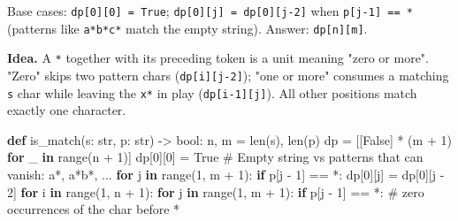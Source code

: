 \documentclass[11pt]{article}
\newenvironment{Shaded}{\begin{snugshade}}{\end{snugshade}}
\newcommand{\BuiltInTok}[1]{\textcolor[rgb]{0.50,0.55,0.55}{#1}}
\newcommand{\CommentTok}[1]{\textcolor[rgb]{0.48,0.49,0.49}{#1}}
\newcommand{\ControlFlowTok}[1]{\textcolor[rgb]{0.99,0.74,0.29}{\textbf{#1}}}
\newcommand{\DecValTok}[1]{\textcolor[rgb]{0.96,0.45,0.00}{#1}}
\newcommand{\KeywordTok}[1]{\textcolor[rgb]{0.81,0.81,0.76}{\textbf{#1}}}
\newcommand{\NormalTok}[1]{\textcolor[rgb]{0.81,0.81,0.76}{#1}}
\newcommand{\OperatorTok}[1]{\textcolor[rgb]{0.81,0.81,0.76}{#1}}
\newcommand{\StringTok}[1]{\textcolor[rgb]{0.96,0.31,0.31}{#1}}
\newcommand{\VariableTok}[1]{\textcolor[rgb]{0.15,0.68,0.68}{#1}}
\begin{document}
Base cases: \texttt{dp{[}0{]}{[}0{]}\ =\ True}; \texttt{dp{[}0{]}{[}j{]}\ =\ dp{[}0{]}{[}j-2{]}} when \texttt{p{[}j-1{]}\ ==\ \textquotesingle{}*\textquotesingle{}} (patterns like \texttt{a*b*c*} match the empty string). Answer: \texttt{dp{[}n{]}{[}m{]}}.

\textbf{Idea.} A \texttt{*} together with its preceding token is a unit meaning "zero or more". "Zero" skips two pattern chars (\texttt{dp{[}i{]}{[}j-2{]}}); "one or more" consumes a matching \texttt{s} char while leaving the \texttt{x*} in play (\texttt{dp{[}i-1{]}{[}j{]}}). All other positions match exactly one character.


\begin{Shaded}
\begin{Highlighting}[]
\KeywordTok{def}\NormalTok{ is\_match(s: }\BuiltInTok{str}\NormalTok{, p: }\BuiltInTok{str}\NormalTok{) }\OperatorTok{{-}\textgreater{}} \BuiltInTok{bool}\NormalTok{:}
\NormalTok{    n, m }\OperatorTok{=} \BuiltInTok{len}\NormalTok{(s), }\BuiltInTok{len}\NormalTok{(p)}
\NormalTok{    dp }\OperatorTok{=}\NormalTok{ [[}\VariableTok{False}\NormalTok{] }\OperatorTok{*}\NormalTok{ (m }\OperatorTok{+} \DecValTok{1}\NormalTok{) }\ControlFlowTok{for}\NormalTok{ \_ }\KeywordTok{in} \BuiltInTok{range}\NormalTok{(n }\OperatorTok{+} \DecValTok{1}\NormalTok{)]}
\NormalTok{    dp[}\DecValTok{0}\NormalTok{][}\DecValTok{0}\NormalTok{] }\OperatorTok{=} \VariableTok{True}
    \CommentTok{\# Empty string vs patterns that can vanish: a*, a*b*, ...}
    \ControlFlowTok{for}\NormalTok{ j }\KeywordTok{in} \BuiltInTok{range}\NormalTok{(}\DecValTok{1}\NormalTok{, m }\OperatorTok{+} \DecValTok{1}\NormalTok{):}
        \ControlFlowTok{if}\NormalTok{ p[j }\OperatorTok{{-}} \DecValTok{1}\NormalTok{] }\OperatorTok{==} \StringTok{\textquotesingle{}*\textquotesingle{}}\NormalTok{:}
\NormalTok{            dp[}\DecValTok{0}\NormalTok{][j] }\OperatorTok{=}\NormalTok{ dp[}\DecValTok{0}\NormalTok{][j }\OperatorTok{{-}} \DecValTok{2}\NormalTok{]}
    \ControlFlowTok{for}\NormalTok{ i }\KeywordTok{in} \BuiltInTok{range}\NormalTok{(}\DecValTok{1}\NormalTok{, n }\OperatorTok{+} \DecValTok{1}\NormalTok{):}
        \ControlFlowTok{for}\NormalTok{ j }\KeywordTok{in} \BuiltInTok{range}\NormalTok{(}\DecValTok{1}\NormalTok{, m }\OperatorTok{+} \DecValTok{1}\NormalTok{):}
            \ControlFlowTok{if}\NormalTok{ p[j }\OperatorTok{{-}} \DecValTok{1}\NormalTok{] }\OperatorTok{==} \StringTok{\textquotesingle{}*\textquotesingle{}}\NormalTok{:}
                \CommentTok{\# zero occurrences of the char before \textquotesingle{}*\textquotesingle{}}

\end{Highlighting}
\end{Shaded}
\end{document}

